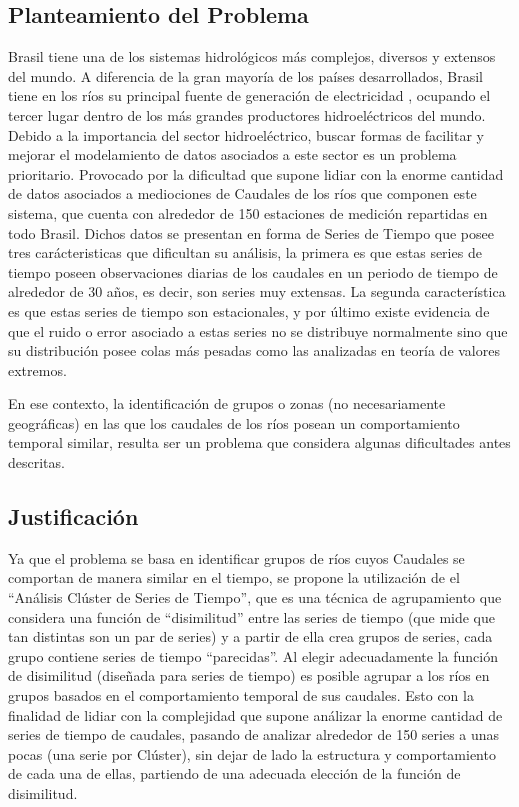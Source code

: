 \documentclass[10pt,a4paper]{article}
\begin{document}
\subsection{Planteamiento del Problema}
Brasil tiene una de los sistemas hidrológicos más complejos, diversos y extensos del mundo. A diferencia de la gran mayoría de los países desarrollados, Brasil tiene en los ríos su principal fuente de generación de electricidad , ocupando el tercer lugar dentro de los más grandes productores hidroeléctricos del mundo. Debido a la importancia del sector hidroeléctrico, buscar formas de facilitar y mejorar el modelamiento de datos asociados a este sector es un problema prioritario. Provocado por la dificultad que supone lidiar con la enorme cantidad de datos asociados a mediociones de Caudales de los ríos que componen este sistema, que cuenta con alrededor de 150 estaciones de medición repartidas en todo Brasil. Dichos datos se presentan en forma de Series de Tiempo que posee tres carácteristicas que dificultan su análisis, la primera es que estas series de tiempo poseen observaciones diarias de los caudales en un periodo de tiempo de alrededor de 30 años, es decir, son series muy extensas. La segunda característica es que estas series de tiempo son estacionales, y por último existe evidencia de que el ruido o error asociado a estas series no se distribuye normalmente sino que su distribución posee colas más pesadas como las analizadas en teoría de valores extremos.

En ese contexto, la identificación de grupos o zonas (no necesariamente geográficas) en las que los caudales de los ríos posean un comportamiento temporal similar, resulta ser un problema que considera algunas dificultades antes descritas.



\subsection{Justificación}
Ya que el problema se basa en identificar grupos de ríos cuyos Caudales se comportan de manera similar en el tiempo, se propone la utilización de el “Análisis Clúster de Series de Tiempo”, que es una técnica de agrupamiento que considera una función de “disimilitud” entre las series de tiempo (que mide que tan distintas son un par de series) y a partir de ella crea grupos de series, cada grupo contiene series de tiempo “parecidas”. Al elegir adecuadamente la función de disimilitud (diseñada para series de tiempo) es posible agrupar a los ríos en grupos basados en el comportamiento temporal de sus caudales. Esto con la finalidad de lidiar con la complejidad que supone análizar la enorme cantidad de series de tiempo de caudales, pasando de analizar alrededor de 150 series a unas pocas (una serie por Clúster), sin dejar de lado la estructura y comportamiento de cada una de ellas, partiendo de una adecuada elección de la función de disimilitud.
\end{document}

